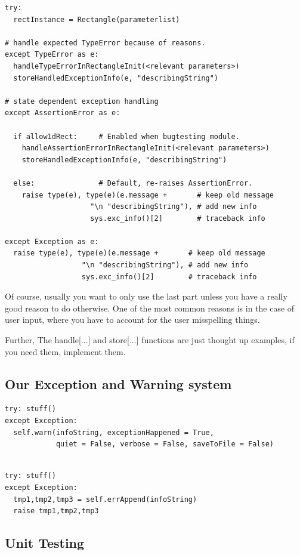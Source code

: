 \documentclass[10pt,a4paper]{article}
\begin{document}
\begin{lstlisting}
try: 
  rectInstance = Rectangle(parameterlist)

# handle expected TypeError because of reasons.
except TypeError as e:  
  handleTypeErrorInRectangleInit(<relevant parameters>)
  storeHandledExceptionInfo(e, "describingString")
  
# state dependent exception handling
except AssertionError as e: 

  if allow1dRect:     # Enabled when bugtesting module. 
    handleAssertionErrorInRectangleInit(<relevant parameters>)
    storeHandledExceptionInfo(e, "describingString")

  else:               # Default, re-raises AssertionError.
    raise type(e), type(e)(e.message +       # keep old message
                    "\n "describingString"), # add new info
                    sys.exc_info()[2]        # traceback info
  
except Exception as e: 
  raise type(e), type(e)(e.message +       # keep old message
                  "\n "describingString"), # add new info
                  sys.exc_info()[2]        # traceback info
\end{lstlisting}
Of course, usually you want to only use the last part unless you have a really good reason to do otherwise. One of the most common reasons is in the case of user input, where you have to account for the user misspelling things.

Further, The handle[...] and store[...] functions are just thought up examples, if you need them, implement them.

\newpage
\subsection{Our Exception and Warning system}


\begin{lstlisting}
try: stuff()
except Exception:
  self.warn(infoString, exceptionHappened = True, 
            quiet = False, verbose = False, saveToFile = False)

\end{lstlisting}

\begin{lstlisting}

try: stuff()
except Exception:
  tmp1,tmp2,tmp3 = self.errAppend(infoString)
  raise tmp1,tmp2,tmp3
\end{lstlisting}


\newpage
\subsection{Unit Testing}
\end{document}
